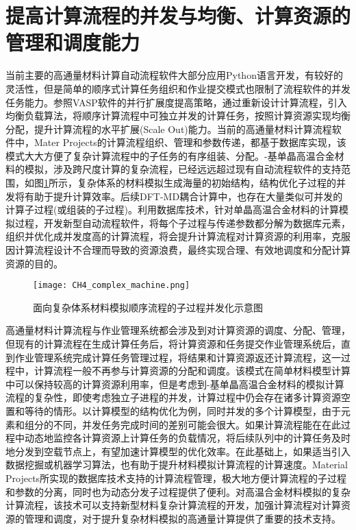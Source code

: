 \section{提高计算流程的并发与均衡、计算资源的管理和调度能力}
当前主要的高通量材料计算自动流程软件大部分应用\textrm{Python}语言开发，有较好的灵活性，但是简单的顺序式计算任务组织和作业提交模式也限制了流程软件的并发任务能力。参照\textrm{VASP}软件的并行扩展度提高策略，通过重新设计计算流程，引入均衡负载算法，将顺序计算流程中可独立并发的计算任务，按照计算资源实现均衡分配，提升计算流程的水平扩展\textrm{(Scale Out)}能力。当前的高通量材料计算流程软件中，\textrm{Mater Projects}的计算流程组织、管理和参数传递，都基于数据库实现，该模式大大方便了复杂计算流程中的子任务的有序组装、分配。-基单晶高温合金材料的模拟，涉及跨尺度计算的复杂流程，已经远远超过现有自动流程软件的支持范围，如图\ref{CH4_comp_BCC}所示，复杂体系的材料模拟生成海量的初始结构，结构优化子过程的并发将有助于提升计算效率。后续\textrm{DFT-MD}耦合计算中，也存在大量类似可并发的计算子过程(或组装的子过程)。利用数据库技术，针对单晶高温合金材料的计算模拟过程，开发新型自动流程软件，将每个子过程与传递参数都分解为数据库元素，组织并优化成并发度高的计算流程，将会提升计算流程对计算资源的利用率，克服因计算流程设计不合理而导致的资源浪费，最终实现合理、有效地调度和分配计算资源的目的。
\begin{figure}[h!]
\centering
\vskip -2pt
\texttt{[image: CH4\_complex\_machine.png]}
\caption{面向复杂体系材料模拟顺序流程的子过程并发化示意图}%
\label{CH4_comp_BCC}
\end{figure}
高通量材料计算流程与作业管理系统都会涉及到对计算资源的调度、分配、管理，但现有的计算流程在生成计算任务后，将计算资源和任务提交作业管理系统后，直到作业管理系统完成计算任务管理过程，将结果和计算资源返还计算流程，这一过程中，计算流程一般不再参与计算资源的分配和调度。该模式在简单材料模型计算中可以保持较高的计算资源利用率，但是考虑到-基单晶高温合金材料的模拟计算流程的复杂性，即使考虑独立子进程的并发，计算过程中仍会存在诸多计算资源空置和等待的情形。以计算模型的结构优化为例，同时并发的多个计算模型，由于元素和组分的不同，并发任务完成时间的差别可能会很大。如果计算流程能在在此过程中动态地监控各计算资源上计算任务的负载情况，将后续队列中的计算任务及时地分发到空载节点上，有望加速计算模型的优化效率。在此基础上，如果适当引入数据挖掘或机器学习算法，也有助于提升材料模拟计算流程的计算速度。\textrm{Material Projects}所实现的数据库技术支持的计算流程管理，极大地方便计算流程的子过程和参数的分离，同时也为动态分发子过程提供了便利。对高温合金材料模拟的复杂计算流程，该技术可以支持新型材料复杂计算流程的开发，加强计算流程对计算资源的管理和调度，对于提升复杂材料模拟的高通量计算提供了重要的技术支持。

